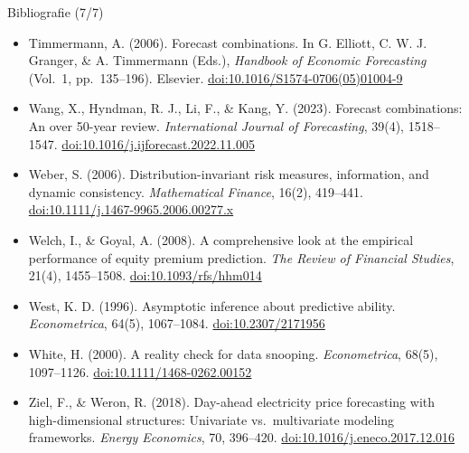 \begin{frame}{Bibliografie (7/7)}
\itemsize{\tiny}
\begin{itemize}
    \item Timmermann, A. (2006). Forecast combinations. In G. Elliott, C. W. J. Granger, \& A. Timmermann (Eds.), \textit{Handbook of Economic Forecasting} (Vol.\ 1, pp.\ 135--196). Elsevier. \href{https://doi.org/10.1016/S1574-0706(05)01004-9}{doi:10.1016/S1574-0706(05)01004-9}
    \item Wang, X., Hyndman, R. J., Li, F., \& Kang, Y. (2023). Forecast combinations: An over 50-year review. \textit{International Journal of Forecasting}, 39(4), 1518--1547. \href{https://doi.org/10.1016/j.ijforecast.2022.11.005}{doi:10.1016/j.ijforecast.2022.11.005}
    \item Weber, S. (2006). Distribution-invariant risk measures, information, and dynamic consistency. \textit{Mathematical Finance}, 16(2), 419--441. \href{https://doi.org/10.1111/j.1467-9965.2006.00277.x}{doi:10.1111/j.1467-9965.2006.00277.x}
    \item Welch, I., \& Goyal, A. (2008). A comprehensive look at the empirical performance of equity premium prediction. \textit{The Review of Financial Studies}, 21(4), 1455--1508. \href{https://doi.org/10.1093/rfs/hhm014}{doi:10.1093/rfs/hhm014}
    \item West, K. D. (1996). Asymptotic inference about predictive ability. \textit{Econometrica}, 64(5), 1067--1084. \href{https://doi.org/10.2307/2171956}{doi:10.2307/2171956}
    \item White, H. (2000). A reality check for data snooping. \textit{Econometrica}, 68(5), 1097--1126. \href{https://doi.org/10.1111/1468-0262.00152}{doi:10.1111/1468-0262.00152}
    \item Ziel, F., \& Weron, R. (2018). Day-ahead electricity price forecasting with high-dimensional structures: Univariate vs.\ multivariate modeling frameworks. \textit{Energy Economics}, 70, 396--420. \href{https://doi.org/10.1016/j.eneco.2017.12.016}{doi:10.1016/j.eneco.2017.12.016}
\end{itemize}
\end{frame}


